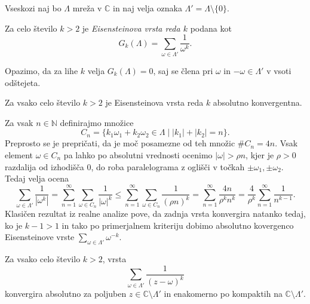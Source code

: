\documentclass[mat1]{fmfdelo}
\numberwithin{equation}{section}
\newcommand{\N}{\mathbb N}
\newcommand{\C}{\mathbb C}
\newcommand{\om}{\omega}
\newcommand{\abs}[1]{\left\lvert #1 \right\rvert}
\theoremstyle{definition}
\begin{document}
Vseskozi naj bo $\Lambda$ mreža v $\C$ in naj velja oznaka $\Lambda' = \Lambda \setminus \{0\}$.

\begin{definicija}
    \label{eisensteinova vrsta}
    Za celo število $k > 2$ je \emph{Eisensteinova vrsta reda $k$} podana kot
    \[
        G_k(\Lambda) = \sum_{\om \in \Lambda'} \frac{1}{\om^k}.  
    \]
\end{definicija}

\begin{opomba}
    Opazimo, da za lihe $k$ velja $G_k(\Lambda) = 0$, saj se člena pri $\om$ in $-\om\in\Lambda'$ v vsoti odštejeta. 
\end{opomba}

\begin{lema}
    \label{lema o konvergenci eisensteinove vrste}
    Za vsako celo število $k > 2$ je Eisensteinova vrsta reda $k$ absolutno konvergentna.
\end{lema}

\begin{dokaz}
    Za vsak $n \in \N$ definirajmo množice
    \[
        C_n = \{k_1 \om_1 + k_2 \om_2\in \Lambda \mid \abs{k_1} + \abs{k_2} = n\}.  
    \]
    Preprosto se je prepričati, da je moč posamezne od teh množic $\#C_n = 4n$. Vsak element $\om \in C_n$ pa lahko po absolutni vrednosti ocenimo $\left\lvert \om \right\rvert > \rho n$, kjer je $\rho > 0$ razdalija od izhodišča $0$, do roba paralelograma z oglišči v točkah $\pm \om_1, \pm \om_2$. Tedaj velja ocena
    \[
        \sum_{\om \in \Lambda'} \frac{1}{\left\lvert  \om^k \right\rvert} = 
        \sum_{n = 1}^\infty \sum_{\om \in C_n} \frac{1}{\left\lvert  \om \right\rvert^k} \leq
        \sum_{n = 1}^\infty \sum_{\om \in C_n} \frac{1}{(\rho n)^k} =
        \sum_{n = 1}^\infty \frac{4n}{\rho^k n^k} = 
        \frac{4}{\rho^k} \sum_{n = 1}^\infty \frac{1}{n^{k-1}}.
    \]
    Klasičen rezultat iz realne analize pove, da zadnja vrsta konvergira natanko tedaj, ko je $k - 1 > 1$ in tako po primerjalnem kriteriju dobimo absolutno kovergenco Eisensteinove vrste $\sum_{\om \in \Lambda'} \om^{-k}$.
\end{dokaz}

\begin{lema}
    \label{lema o absolutni in enakomerni konvergenci}
    Za vsako celo število $k > 2$, vrsta 
    \[
        \sum_{\om \in \Lambda'} \frac{1}{(z - \om)^k}
    \]
    konvergira absolutno za poljuben $z\in \C\setminus\Lambda'$ in enakomerno po kompaktih na $\C \setminus \Lambda'$. 
\end{lema}
\end{document}
